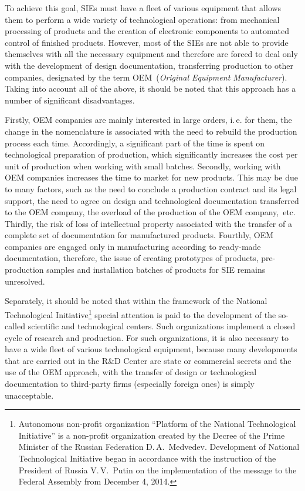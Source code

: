 To achieve this goal, SIEs must have a fleet of various equipment that allows them to perform a wide variety of technological operations: from mechanical processing of products and the creation of electronic components to automated control of finished products. However, most of the SIEs are not able to provide themselves with all the necessary equipment and therefore are forced to deal only with the development of design documentation, transferring production to other companies, designated by the term OEM~(\textit {Original Equipment Manufacturer}). Taking into account all of the above, it should be noted that this approach has a number of significant disadvantages.

Firstly, OEM companies are mainly interested in large orders, i.\,e. for them, the change in the nomenclature is associated with the need to rebuild the production process each time. Accordingly, a significant part of the time is spent on technological preparation of production, which significantly increases the cost per unit of production when working with small batches. Secondly, working with OEM companies increases the time to market for new products. This may be due to many factors, such as the need to conclude a production contract and its legal support, the need to agree on design and technological documentation transferred to the OEM company, the overload of the production of the OEM company,~etc. Thirdly, the risk of loss of intellectual property associated with the transfer of a complete set of documentation for manufactured products. Fourthly, OEM companies are engaged only in manufacturing according to ready-made documentation, therefore, the issue of creating prototypes of products, pre-production samples and installation batches of products for SIE remains unresolved.

Separately, it should be noted that within the framework of the National Technological Initiative\footnote {Autonomous non-profit organization ``Platform of the National Technological Initiative'' is a non-profit organization created by the Decree of the Prime Minister of the Russian Federation D.\,A.~Medvedev. Development of National Technological Initiative began in accordance with the instruction of the President of Russia V.\,V.~Putin on the implementation of the message to the Federal Assembly from December 4, 2014.} special attention is paid to the development of the so-called scientific and technological centers. Such organizations implement a closed cycle of research and production. For such organizations, it is also necessary to have a wide fleet of various technological equipment, because many developments that are carried out in the R\&D Center are state or commercial secrets and the use of the OEM approach, with the transfer of design or technological documentation to third-party firms (especially foreign ones) is simply unacceptable.

